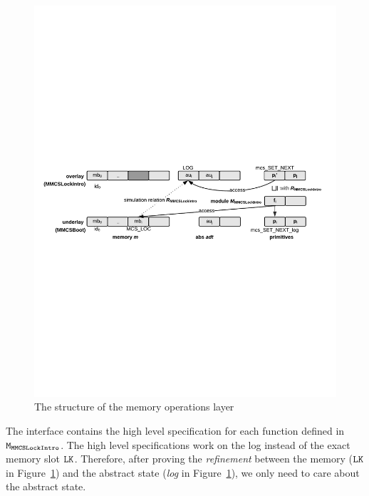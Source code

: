 \begin{figure}
\begin{center}
\includegraphics[width=\linewidth]{figs/mcslock/layer3}
\end{center}
\caption{The structure of the memory operations layer}
\label{fig:chapter:mcslock:layer-struct-mcs-verification}
\end{figure}

The interface  contains the high level specification for each function defined in ${\mathrm{\texttt{M}}}_ {{\mathrm{\texttt{MMCSLockIntro}}}}$. 
The high level specifications work on the log instead of the exact memory slot ${\mathrm{\texttt{LK}}}$.
Therefore, after proving the {\em refinement} between the memory (${\mathrm{\texttt{LK}}}$ in Figure~\ref{fig:chapter:mcslock:layer-struct-mcs-verification})
and the abstract state (\emph{log} in Figure~\ref{fig:chapter:mcslock:layer-struct-mcs-verification}), we only need to care about the abstract state.

